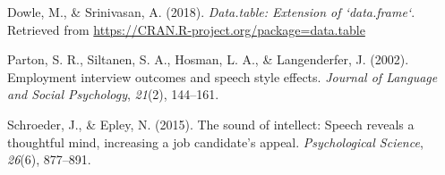 \documentclass[man]{apa6}
\begin{document}
\begingroup
\setlength{\parindent}{-0.5in}
\setlength{\leftskip}{0.5in}

\hypertarget{refs}{}
\leavevmode\hypertarget{ref-R-data.table}{}%
Dowle, M., \& Srinivasan, A. (2018). \emph{Data.table: Extension of `data.frame`}. Retrieved from \url{https://CRAN.R-project.org/package=data.table}

\leavevmode\hypertarget{ref-parton2002employment}{}%
Parton, S. R., Siltanen, S. A., Hosman, L. A., \& Langenderfer, J. (2002). Employment interview outcomes and speech style effects. \emph{Journal of Language and Social Psychology}, \emph{21}(2), 144--161.

\leavevmode\hypertarget{ref-schroeder2015sound}{}%
Schroeder, J., \& Epley, N. (2015). The sound of intellect: Speech reveals a thoughtful mind, increasing a job candidate's appeal. \emph{Psychological Science}, \emph{26}(6), 877--891.

\endgroup
\end{document}
